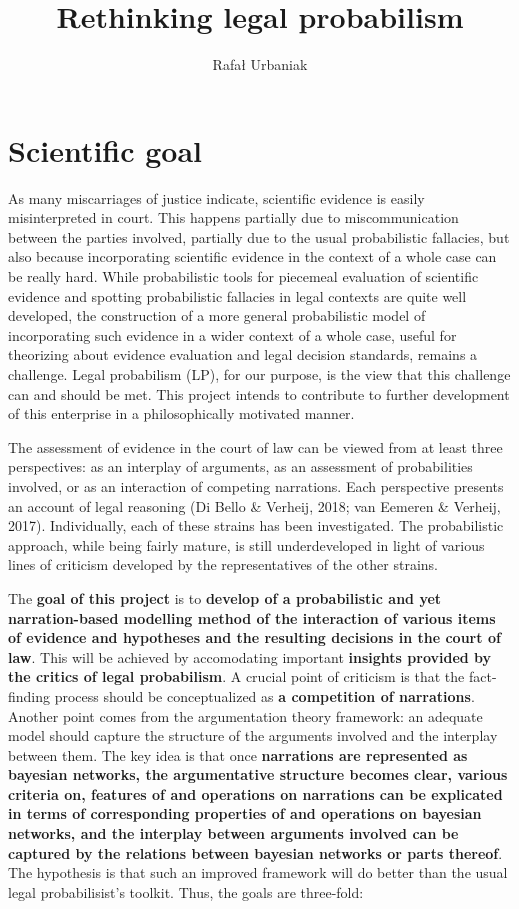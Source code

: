 \documentclass[11pt,dvipsnames,enabledeprecatedfontcommands]{scrartcl}
\title{Rethinking legal probabilism}
\author{Rafał Urbaniak}
\date{}
\begin{document}
\maketitle

\thispagestyle{empty}

\hypertarget{scientific-goal}{%
\section{Scientific goal}\label{scientific-goal}}

As many miscarriages of justice indicate, scientific evidence is easily
misinterpreted in court. This happens partially due to miscommunication
between the parties involved, partially due to the usual probabilistic
fallacies, but also because incorporating scientific evidence in the
context of a whole case can be really hard. While probabilistic tools
for piecemeal evaluation of scientific evidence and spotting
probabilistic fallacies in legal contexts are quite well developed, the
construction of a more general probabilistic model of incorporating such
evidence in a wider context of a whole case, useful for theorizing about
evidence evaluation and legal decision standards, remains a challenge.
Legal probabilism (LP), for our purpose, is the view that this challenge
can and should be met. This project intends to contribute to further
development of this enterprise in a philosophically motivated manner.

The assessment of evidence in the court of law can be viewed from at
least three perspectives: as an interplay of arguments, as an assessment
of probabilities involved, or as an interaction of competing narrations.
Each perspective presents an account of legal reasoning (Di Bello \&
Verheij, 2018; van Eemeren \& Verheij, 2017). Individually, each of
these strains has been investigated. The probabilistic approach, while
being fairly mature, is still underdeveloped in light of various lines
of criticism developed by the representatives of the other strains.

The \textbf{goal of this project} is to
\textbf{develop of a probabilistic and yet narration-based  modelling method of the  interaction of various items of evidence and hypotheses and the resulting decisions in the court of law}.
This will be achieved by accomodating important
\textbf{insights provided by the critics of legal probabilism}. A
crucial point of criticism is that the fact-finding process should be
conceptualized as \textbf{a competition of narrations}. Another point
comes from the argumentation theory framework: an adequate model should
capture the structure of the arguments involved and the interplay
between them. The key idea is that once
\textbf{narrations are represented as bayesian networks, the argumentative structure becomes clear,  various criteria on,  features of  and operations on narrations can be explicated in terms of corresponding properties of and operations on bayesian networks, and the interplay between arguments involved can be captured by the relations between bayesian networks or parts thereof}.
The hypothesis is that such an improved framework will do better than
the usual legal probabilisist's toolkit. Thus, the goals are three-fold:
\end{document}
